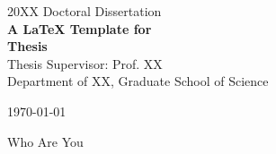 \documentclass[12pt, a4paper, twoside, openright,dvipdfmx]{report}		%
\begin{document}

\begin{titlepage}
\begin{center}

\null
\vspace{1cm}
{\large 20XX Doctoral Dissertation}\\
\vspace{0.5cm}
\vspace{2cm}
{\Huge\bf A \LaTeX{} Template for\\ Thesis\\}
\vfill
{\large Thesis Supervisor: Prof. XX\\}
\vspace{2.5cm}
Department of XX, Graduate School of Science

\vspace{0.2cm}
\today

\vspace{0.5cm}
{\Large Who Are You}
\vspace{2.0cm}
\end{center}
\end{titlepage}

\cleardoublepage
{}
\pagestyle{plain}


\newpage


\newpage


\newpage

\dominitoc
\tableofcontents
\newpage
\listoffigures \mtcaddchapter
\newpage
\listoftables \mtcaddchapter
\cleardoublepage
{}
\setcounter{chapter}{0}
\setcounter{section}{0}
\def\thechapter{\arabic{chapter}}
\pagestyle{fancy}
\fancyhf{}
\fancyhead[LE]{\small\emph{\leftmark}}
\fancyhead[RO]{\small\emph{\rightmark}}
\fancyfoot[CE,CO]{\thepage}
\setcounter{mtc}{5}




\cleardoublepage
\def\thechapter{}
\def\@chapapp{}


\end{document}
